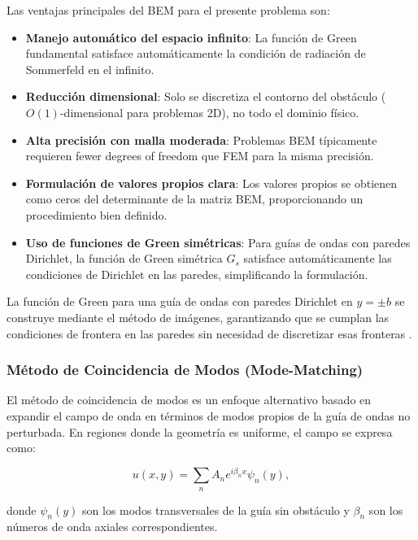 \documentclass[11pt]{article}
\begin{document}
Las ventajas principales del BEM para el presente problema son:

\begin{itemize}
\item \textbf{Manejo automático del espacio infinito}: La función de Green fundamental satisface automáticamente la condición de radiación de Sommerfeld en el infinito.

\item \textbf{Reducción dimensional}: Solo se discretiza el contorno del obstáculo ($O(1)$-dimensional para problemas 2D), no todo el dominio físico.

\item \textbf{Alta precisión con malla moderada}: Problemas BEM típicamente requieren fewer degrees of freedom que FEM para la misma precisión.

\item \textbf{Formulación de valores propios clara}: Los valores propios se obtienen como ceros del determinante de la matriz BEM, proporcionando un procedimiento bien definido.

\item \textbf{Uso de funciones de Green simétricas}: Para guías de ondas con paredes Dirichlet, la función de Green simétrica $G_s$ satisface automáticamente las condiciones de Dirichlet en las paredes, simplificando la formulación.
\end{itemize}

La función de Green para una guía de ondas con paredes Dirichlet en $y = \pm b$ se construye mediante el método de imágenes, garantizando que se cumplan las condiciones de frontera en las paredes sin necesidad de discretizar esas fronteras \cite{Linton1992}.

\subsubsection{Método de Coincidencia de Modos (Mode-Matching)}\label{subsubsec:mode_matching}

El método de coincidencia de modos es un enfoque alternativo basado en expandir el campo de onda en términos de modos propios de la guía de ondas no perturbada. En regiones donde la geometría es uniforme, el campo se expresa como:

\begin{equation}
u(x,y) = \sum_{n} A_n e^{i\beta_n x} \psi_n(y),
\end{equation}

donde $\psi_n(y)$ son los modos transversales de la guía sin obstáculo y $\beta_n$ son los números de onda axiales correspondientes.
\end{document}
